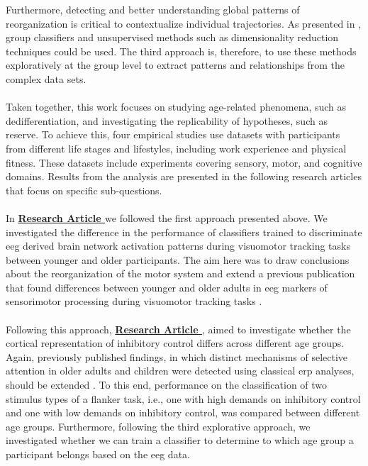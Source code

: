 Furthermore, detecting and better understanding global patterns of reorganization is critical to contextualize individual trajectories. As presented in , group classifiers and unsupervised methods such as dimensionality reduction techniques could be used. The third approach is, therefore, to use these methods exploratively at the group level to extract patterns and relationships from the complex data sets.\\
\\
Taken together, this work focuses on studying age-related phenomena, such as dedifferentiation, and investigating the replicability of hypotheses, such as reserve. To achieve this, four empirical studies use datasets with participants from different life stages and lifestyles, including work experience and physical fitness. These datasets include experiments covering sensory, motor, and cognitive domains. Results from the analysis are presented in the following research articles that focus on specific sub-questions.\\
\\
In \textbf{\hyperref[pub:paperI]{Research Article }} we followed the first approach presented above. We investigated the difference in the performance of classifiers trained to discriminate \gls{eeg} derived brain network activation patterns during visuomotor tracking tasks between younger and older participants. The aim here was to draw conclusions about the reorganization of the motor system and extend a previous publication that found differences between younger and older adults in \gls{eeg} markers of sensorimotor processing during visuomotor tracking tasks \cite{Vieluf2018}.\\
\\
Following this approach, \textbf{\hyperref[pub:paperII]{Research Article }}, aimed to investigate whether the cortical representation of inhibitory control differs across different age groups. Again, previously published findings, in which distinct mechanisms of selective attention in older adults and children were detected using classical \gls{erp} analyses, should be extended \cite{Reuter2019}. To this end, performance on the classification of two stimulus types of a flanker task, i.e., one with high demands on inhibitory control and one with low demands on inhibitory control, was compared between different age groups. Furthermore, following the third explorative approach, we investigated whether we can train a classifier to determine to which age group a participant belongs based on the \gls{eeg} data.\\
